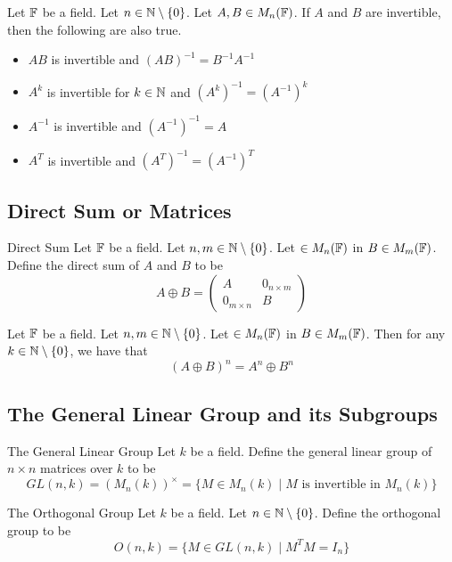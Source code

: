 \documentclass[a4paper]{article}
\begin{document}
\begin{prp}{}{} Let $\mathbb{F}$ be a field. Let $n\in\mathbb{N}\setminus\{0\}$. Let $A,B\in M_n(\mathbb{F})$. If $A$ and $B$ are invertible, then the following are also true. 
\begin{itemize}
\item $AB$ is invertible and $(AB)^{-1}=B^{-1}A^{-1}$
\item $A^k$ is invertible for $k\in\mathbb{N}$ and $(A^k)^{-1}=(A^{-1})^k$
\item $A^{-1}$ is invertible and $(A^{-1})^{-1}=A$
\item $A^T$ is invertible and $(A^T)^{-1}=(A^{-1})^T$
\end{itemize}
\end{prp}

\subsection{Direct Sum or Matrices}
\begin{defn}{Direct Sum}{} Let $\mathbb{F}$ be a field. Let $n,m\in\mathbb{N}\setminus\{0\}$. Let $\in M_n(\mathbb{F})$ in $B\in M_m(\mathbb{F})$. Define the direct sum of $A$ and $B$ to be $$A\oplus B=\begin{pmatrix}
A & 0_{n\times m}\\
0_{m\times n} & B
\end{pmatrix}$$
\end{defn}

\begin{lmm}{}{} Let $\mathbb{F}$ be a field. Let $n,m\in\mathbb{N}\setminus\{0\}$. Let $\in M_n(\mathbb{F})$ in $B\in M_m(\mathbb{F})$. Then for any $k\in\mathbb{N}\setminus\{0\}$, we have that $$(A\oplus B)^n=A^n\oplus B^n$$
\end{lmm}

\subsection{The General Linear Group and its Subgroups}
\begin{defn}{The General Linear Group}{} Let $k$ be a field. Define the general linear group of $n\times n$ matrices over $k$ to be $$ GL(n,k)=(M_n(k))^\times=\{M\in M_n(k)\;|\;M\text{ is invertible in }M_n(k)\}$$
\end{defn}

\begin{defn}{The Orthogonal Group}{} Let $k$ be a field. Let $n\in\mathbb{N}\setminus\{0\}$. Define the orthogonal group to be $$O(n,k)=\{M\in GL(n,k)\;|\;M^TM=I_n\}$$
\end{defn}
\end{document}
